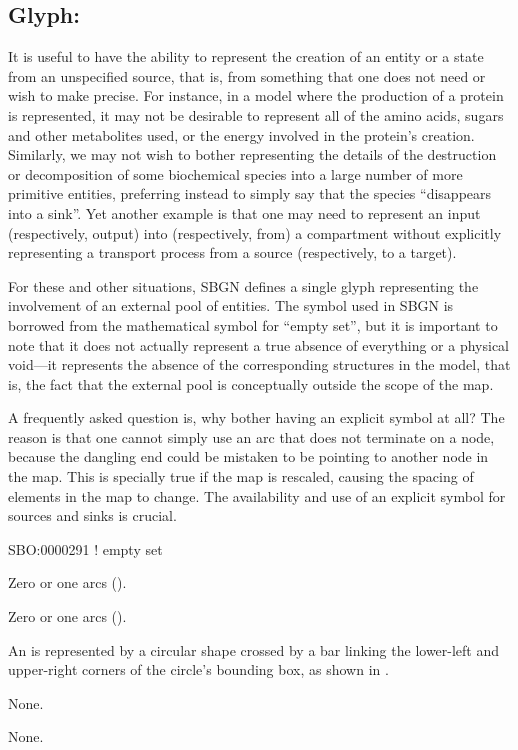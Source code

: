 \subsection{Glyph: }
\label{sec:emptySet}

It is useful to have the ability to represent the creation of an entity or a state from an unspecified source, that is, from something that one does not need or wish to make precise.  For instance, in a model where the production of a protein is represented, it may not be desirable to represent all of the amino acids, sugars and other metabolites used, or the energy involved in the protein's creation.
Similarly, we may not wish to bother representing the details of the destruction or decomposition of some biochemical species into a large number of more primitive entities, preferring instead to simply say that the species ``disappears into a sink''.
Yet another example is that one may need to represent an input (respectively, output) into (respectively, from) a compartment without explicitly representing a transport process from a source (respectively, to a target).

For these and other situations, SBGN defines a single glyph representing the involvement of an external pool of entities.
The symbol used in SBGN is borrowed from the mathematical symbol for ``empty set'', but it is important to note that it does not actually represent a true absence of everything or a physical void---it represents the absence of the corresponding structures in the model, that is, the fact that the external pool is conceptually outside the scope of the map.

A frequently asked question is, why bother having an explicit symbol at all?
The reason is that one cannot simply use an arc that does not terminate on a node, because the dangling end could be mistaken to be pointing to another node in the map.  This is specially true if the map is rescaled, causing the spacing of elements in the map to change.
The availability and use of an explicit symbol for sources and sinks is crucial.

\begin{glyphDescription}

\glyphSboTerm
SBO:0000291 ! empty set


\glyphIncoming
Zero or one  arcs ().



\glyphOutgoing
Zero or one  arcs ().


\glyphContainer
An  is represented by a circular shape crossed by a bar linking the lower-left and upper-right corners of the circle's bounding box, as shown in .

\glyphLabel
None.

\glyphAux
None.

\end{glyphDescription}


